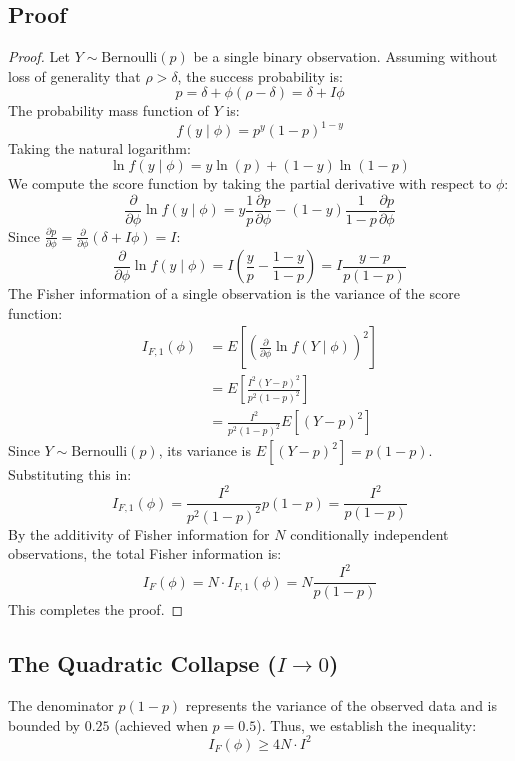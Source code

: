 \documentclass[11pt,a4paper]{article}
\begin{document}
\subsection{Proof}
\begin{proof}
Let $Y \sim \text{Bernoulli}(p)$ be a single binary observation. Assuming without loss of generality that $\rho > \delta$, the success probability is:
\[
p = \delta + \phi(\rho - \delta) = \delta + I\phi
\]
The probability mass function of $Y$ is:
\[
f(y \mid \phi) = p^y (1 - p)^{1 - y}
\]
Taking the natural logarithm:
\[
\ln f(y \mid \phi) = y \ln(p) + (1 - y) \ln(1 - p)
\]
We compute the score function by taking the partial derivative with respect to $\phi$:
\[
\frac{\partial}{\partial \phi} \ln f(y \mid \phi) = y \frac{1}{p} \frac{\partial p}{\partial \phi} - (1 - y) \frac{1}{1 - p} \frac{\partial p}{\partial \phi}
\]
Since $\frac{\partial p}{\partial \phi} = \frac{\partial}{\partial \phi} (\delta + I\phi) = I$:
\[
\frac{\partial}{\partial \phi} \ln f(y \mid \phi) = I \left( \frac{y}{p} - \frac{1 - y}{1 - p} \right) = I \frac{y - p}{p(1 - p)}
\]
The Fisher information of a single observation is the variance of the score function:
\begin{align*}
    I_{F, 1}(\phi) &= E\left[ \left( \frac{\partial}{\partial \phi} \ln f(Y \mid \phi) \right)^2 \right] \\
    &= E\left[ \frac{I^2 (Y - p)^2}{p^2 (1 - p)^2} \right] \\
    &= \frac{I^2}{p^2 (1 - p)^2} E[(Y - p)^2]
\end{align*}
Since $Y \sim \text{Bernoulli}(p)$, its variance is $E[(Y - p)^2] = p(1-p)$. Substituting this in:
\[
I_{F, 1}(\phi) = \frac{I^2}{p^2 (1 - p)^2} p(1 - p) = \frac{I^2}{p(1 - p)}
\]
By the additivity of Fisher information for $N$ conditionally independent observations, the total Fisher information is:
\[
I_F(\phi) = N \cdot I_{F, 1}(\phi) = N \frac{I^2}{p(1 - p)}
\]
This completes the proof.
\end{proof}

\subsection{The Quadratic Collapse ($I \to 0$)}
The denominator $p(1 - p)$ represents the variance of the observed data and is bounded by $0.25$ (achieved when $p = 0.5$). Thus, we establish the inequality:
\begin{equation}\label{eq:scaling_bound}
I_F(\phi) \ge 4 N \cdot I^2
\end{equation}
\end{document}

